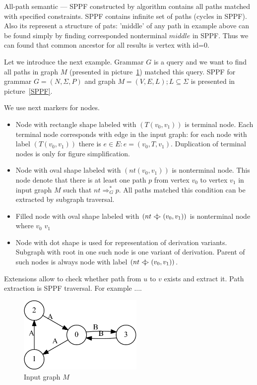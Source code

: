 \documentclass{sig-alternate} %
\begin{document}
All-path semantic --- SPPF constructed by algorithm contains all paths matched with specified constraints. SPPF contains infinite set of paths (cycles in SPPF). 
Also its represent a structure of pats: 'middle' of any path in example above can be found simply by finding corresponded nonterminal $middle$ in SPPF.
Thus we can found that common ancestor for all results is vertex with id=$0$. 


Let we introduce the next example. Grammar $G$ is a query and we want to find all paths in graph $M$ (presented in picture~\ref{input}) matched this query.
SPPF for grammar $G = (N, \Sigma ,P)$ and graph $M = (V,E,L); L \subseteq \Sigma$ is presented in picture~\ref{SPPF}. 

We use next markers for nodes.
\begin{itemize}
    \item Node with rectangle shape labeled with $(T (v_0, v_1))$ is terminal node. 
    Each terminal node corresponds with edge in the input graph: for each node with label $(T (v_0, v_1))$ there is $e\in E: e=(v_0,T,v_1)$.
    Duplication of terminal nodes is only for figure simplification.
    \item Node with oval shape labeled with $(nt (v_0, v_1))$ is nonterminal node. 
    This node denote that there is at least one path $p$ from vertex $v_0$ to vertex $v_1$ in input graph $M$ such that $nt \Rightarrow^*_G p$.
    All paths matched this condition can be extracted by subgraph traversal. 
    \item Filled node with oval shape labeled with $(nt <\mkern-11mu | \mkern-11mu> (v_0, v_1))$ is nonterminal node where $v_0$ $v_1$    
    \item Node with dot shape is used for representation of derivation variants. Subgraph with root in one such node is one variant of derivation. Parent of such nodes is always node with label $(nt <\mkern-11mu | \mkern-11mu> (v_0, v_1))$.
\end{itemize}

Extensions allow to check whether path from $u$ to $v$ exists and extract it. Path extraction is SPPF traversal. For example ....

\begin{figure}[h]
    \begin{center}
        \includegraphics[width=6cm]{dot/input.pdf}
        \caption{Input graph $M$}
        \label{input}        
    \end{center}
\end{figure}
\end{document}
